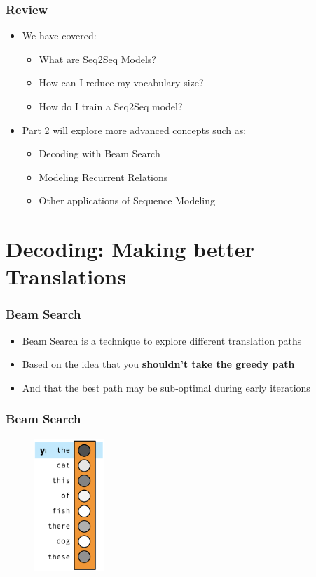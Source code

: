 \documentclass[usenames,dvipsnames]{beamer}
\begin{document}
\begin{frame}
  \frametitle{Review}
  \begin{itemize}
    \item We have covered:
    \begin{itemize}
      \item What are Seq2Seq Models?
      \item How can I reduce my vocabulary size?
      \item How do I train a Seq2Seq model?
    \end{itemize}
    \item Part 2 will explore more advanced concepts such as:
    \begin{itemize}
      \item Decoding with Beam Search
      \item Modeling Recurrent Relations
      \item Other applications of Sequence Modeling
    \end{itemize}
  \end{itemize}
\end{frame}

\section{Decoding: Making better Translations}

\begin{frame}
  \frametitle{Beam Search}
  \begin{itemize}
    \item Beam Search is a technique to explore different translation paths
    \item Based on the idea that you \textbf{shouldn't take the greedy path}
    \item And that the best path may be sub-optimal during early iterations
  \end{itemize}
\end{frame}

\begin{frame}
\frametitle{Beam Search}
\begin{figure}
  \centering
  \includegraphics[height=5cm, valign=c]{assets/beam1}
\end{figure}
\end{frame}
\end{document}
